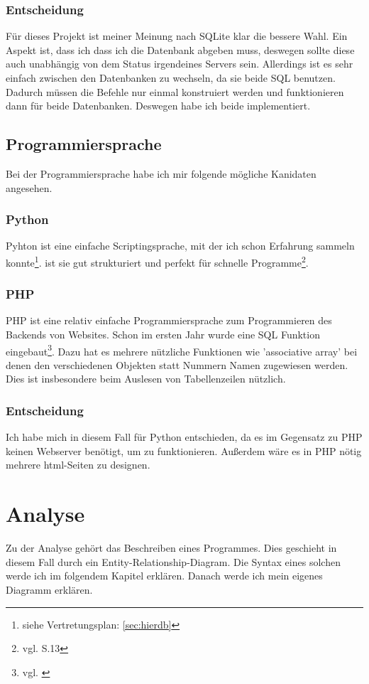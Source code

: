 \documentclass[a4paper, 12pt]{article}
\theoremstyle{plain}
\theoremstyle{definition}
\begin{document}
	
	\subsubsection{Entscheidung}
	Für dieses Projekt ist meiner Meinung nach SQLite klar die bessere Wahl. Ein Aspekt ist, dass ich dass ich die Datenbank abgeben muss,  deswegen sollte diese auch unabhängig von dem Status irgendeines Servers sein. Allerdings ist es sehr einfach zwischen den Datenbanken zu wechseln, da sie beide SQL benutzen. Dadurch müssen die Befehle nur einmal konstruiert werden und funktionieren dann für beide Datenbanken. Deswegen habe ich beide implementiert.
	
	\subsection{Programmiersprache}
	Bei der Programmiersprache habe ich mir folgende mögliche Kanidaten angesehen.
	\subsubsection{Python}
	\label{sec:py}
	Pyhton ist eine einfache Scriptingsprache, mit der ich schon Erfahrung sammeln konnte\footnote{siehe Vertretungsplan: \ref{sec:hierdb}}.  ist sie gut strukturiert und perfekt für schnelle Programme\footnote{vgl. \cite{Dave13} S.13}.
	
	\subsubsection{PHP}
	\label{sec:php}
	PHP ist eine relativ einfache Programmiersprache zum Programmieren des Backends von Websites. Schon im ersten Jahr wurde eine SQL Funktion eingebaut\footnote{vgl. \cite{phpGesch}}. Dazu hat es mehrere nützliche Funktionen wie 'associative array' bei denen den verschiedenen Objekten statt Nummern Namen zugewiesen werden. Dies ist insbesondere beim Auslesen von Tabellenzeilen nützlich.
	
	\subsubsection{Entscheidung}
	Ich habe mich in diesem Fall für Python entschieden, da es im Gegensatz zu PHP keinen Webserver benötigt, um zu funktionieren. Außerdem wäre es in PHP nötig mehrere html-Seiten zu designen.
	
	\section{Analyse}
	\label{sec:loes}
	Zu der Analyse gehört das Beschreiben eines Programmes. Dies geschieht in diesem Fall durch ein Entity-Relationship-Diagram. Die Syntax eines solchen werde ich im folgendem Kapitel erklären. Danach werde ich mein eigenes Diagramm erklären.
	
\end{document}
